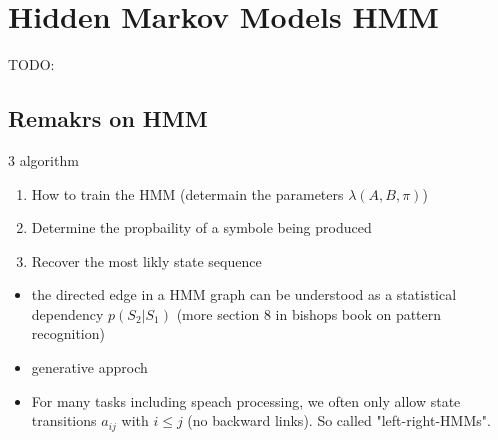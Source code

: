 
\section*{Hidden Markov Models HMM}
TODO:

\subsection*{Remakrs on HMM}

3 algorithm
\begin{enumerate}
    \item  How to train the HMM (determain the parameters $\lambda (A, B, \pi)$)
    \item  Determine the propbaility of a symbole being produced
    \item  Recover the most likly state sequence
\end{enumerate}

\begin{itemize}
    \item the directed edge in a HMM graph can be understood as a statistical dependency $p(S_2|S_1)$ (more section 8 in bishops book on pattern recognition)
    \item generative approch
    \item For many tasks including speach processing, we often only allow state transitions $a_{ij}$ with $i \le j$ (no backward links). So called "left-right-HMMs".
\end{itemize}
